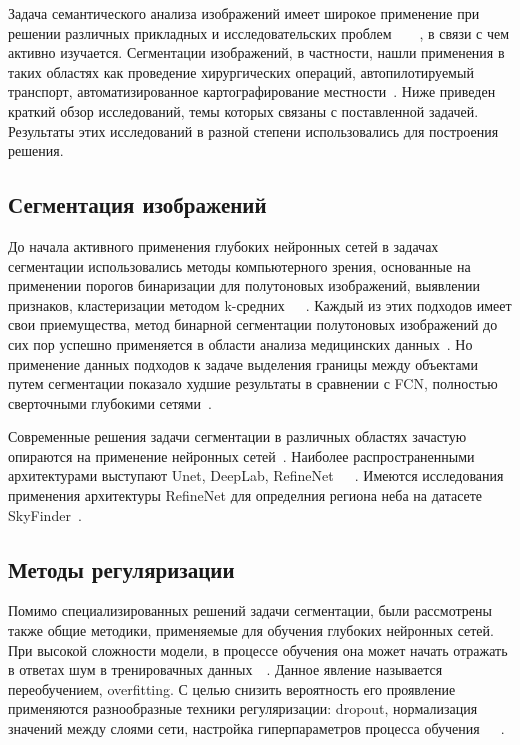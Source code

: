 Задача семантического анализа изображений имеет широкое применение при решении различных прикладных и исследовательских проблем~\autocite{maier2018gentle}~\autocite{pan2019image}~\autocite{stabinger2020evaluating}~\autocite{li2015brief}, в связи с чем активно изучается. Сегментации изображений, в частности, нашли применения в таких областях как проведение хирургических операций, автопилотируемый транспорт, автоматизированное картографирование местности~\autocite{liu2018recent}. Ниже приведен краткий обзор исследований, темы которых связаны с поставленной задачей. Результаты этих исследований в разной степени использовались для построения решения. 

\subsection{Сегментация изображений}

До начала активного применения глубоких нейронных сетей в задачах сегментации использовались методы компьютерного зрения, основанные на применении порогов бинаризации для полутоновых изображений, выявлении признаков, кластеризации методом k-средних~\autocite{10.5555/1888028.1888043}~\autocite{10.5555/540298}~\autocite{inproceedings}. Каждый из этих подходов имеет свои приемущества, метод бинарной сегментации полутоновых изображений до сих пор успешно применяется в области анализа медицинских данных~\autocite{bookMedicalImages}. Но применение данных подходов к задаче выделения границы между объектами путем сегментации показало худшие результаты в сравнении с FCN, полностью сверточными глубокими сетями~\autocite{7966418}.

Современные решения задачи сегментации в различных областях зачастую опираются на применение нейронных сетей~\autocite{feng2019deep}. Наиболее распространенными архитектурами выступают Unet, DeepLab, RefineNet~\autocite{ronneberger2015unet}~\autocite{chen2016deeplab}~\autocite{lin2016refinenet}. Имеются исследования применения архитектуры RefineNet для определния региона неба на датасете SkyFinder~\autocite{place2017segmenting}.


\subsection{Методы регуляризации}

Помимо специализированных решений задачи сегментации, были рассмотрены также общие методики, применяемые для обучения глубоких нейронных сетей. При высокой сложности модели, в процессе обучения она может начать отражать в ответах шум в тренировачных данных~\autocite{salman2019overfitting}~\autocite{ghojogh2019theory}. Данное явление называется переобучением, overfitting. С целью снизить вероятность его проявление применяются разнообразные техники регуляризации: dropout, нормализация значений между слоями сети, настройка гиперпараметров процесса обучения~\autocite{smith2018disciplined}~\autocite{labach2019survey}~\autocite{ioffe2015batch}.


